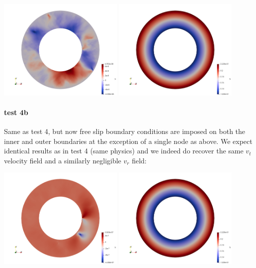 \begin{center}
\includegraphics[width=6cm]{python_codes/fieldstone_33/results_test4/vr}
\includegraphics[width=6cm]{python_codes/fieldstone_33/results_test4/vt}
\end{center}


\paragraph{test 4b} Same as test 4, but now free slip boundary conditions are imposed on both the 
inner and outer boundaries at the exception of a single node as above. 
We expect identical results as in test 4 (same physics) and we indeed do recover the same
$v_t$ velocity field and a similarly negligible $v_r$ field:

\begin{center}
\includegraphics[width=6cm]{python_codes/fieldstone_33/results_test4b/vr}
\includegraphics[width=6cm]{python_codes/fieldstone_33/results_test4b/vt}
\end{center}

